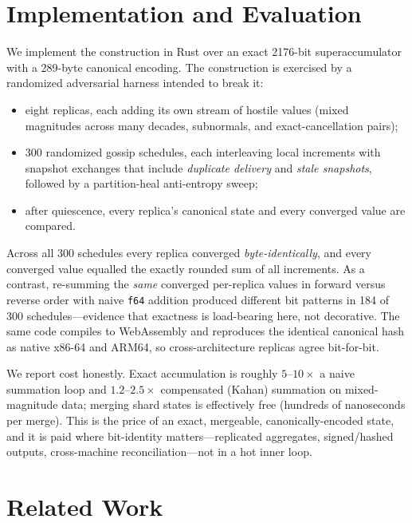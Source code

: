\documentclass[11pt]{article}
\begin{document}
\section{Implementation and Evaluation}\label{sec:eval}

We implement the construction in Rust over an exact 2176-bit superaccumulator with a 289-byte canonical
encoding. The construction is exercised by a randomized adversarial harness intended to break it:

\begin{itemize}[leftmargin=1.4em,itemsep=1pt]
  \item eight replicas, each adding its own stream of hostile values (mixed magnitudes across many
  decades, subnormals, and exact-cancellation pairs);
  \item 300 randomized gossip schedules, each interleaving local increments with snapshot exchanges that
  include \emph{duplicate delivery} and \emph{stale snapshots}, followed by a partition-heal
  anti-entropy sweep;
  \item after quiescence, every replica's canonical state and every converged value are compared.
\end{itemize}

Across all 300 schedules every replica converged \emph{byte-identically}, and every converged value
equalled the exactly rounded sum of all increments. As a contrast, re-summing the \emph{same} converged
per-replica values in forward versus reverse order with naive \texttt{f64} addition produced different
bit patterns in 184 of 300 schedules---evidence that exactness is load-bearing here, not decorative. The
same code compiles to WebAssembly and reproduces the identical canonical hash as native x86-64 and
ARM64, so cross-architecture replicas agree bit-for-bit.

We report cost honestly. Exact accumulation is roughly $5$--$10\times$ a naive summation loop and
$1.2$--$2.5\times$ compensated (Kahan) summation on mixed-magnitude data; merging shard states is
effectively free (hundreds of nanoseconds per merge). This is the price of an exact, mergeable,
canonically-encoded state, and it is paid where bit-identity matters---replicated aggregates,
signed/hashed outputs, cross-machine reconciliation---not in a hot inner loop.

\section{Related Work}\label{sec:related}
\end{document}
